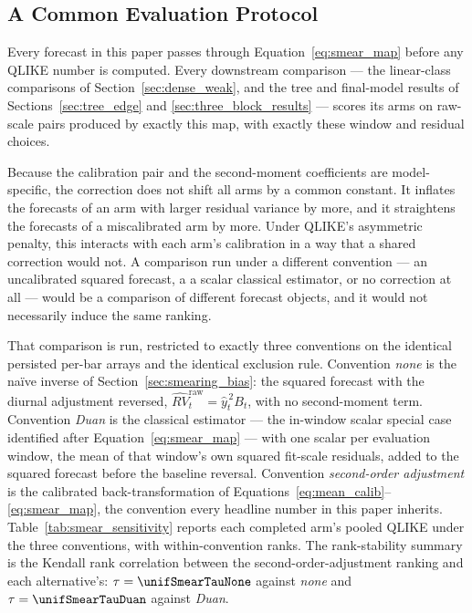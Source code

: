 \iffalse
\subsection{A Common Evaluation Protocol}
\label{sec:smearing_contract}

Every forecast in this paper passes through Equation~\eqref{eq:smear_map}
before any QLIKE number is computed. Every downstream comparison --- the
linear-class comparisons of Section~\ref{sec:dense_weak}, and the tree and final-model results of
Sections~\ref{sec:tree_edge} and \ref{sec:three_block_results} --- scores
its arms on raw-scale pairs produced by exactly this map,
with exactly these window and residual choices.

Because the calibration pair and the second-moment coefficients are
model-specific, the correction does not shift all arms by a common
constant. It inflates the forecasts of an arm with larger residual
variance by more, and it straightens the forecasts of a miscalibrated arm
by more. Under QLIKE's asymmetric penalty, this interacts with each arm's
calibration in a way that a shared correction would not. A comparison run
under a different convention --- an uncalibrated squared forecast, a
a scalar classical estimator, or no correction at all --- would be a comparison
of different forecast objects, and it would not necessarily induce the
same ranking.

That comparison is run, restricted to exactly three conventions on the
identical persisted per-bar arrays and the identical exclusion rule.
Convention \emph{none} is the na\"ive inverse of
Section~\ref{sec:smearing_bias}: the squared forecast with the diurnal
adjustment reversed, $\widehat{RV}_t^{\mathrm{raw}} = \hat{y}_t^{\,2} B_t$,
with no second-moment term. Convention \emph{Duan} is the classical \citet{Duan1983}
estimator --- the in-window scalar special case identified after
Equation~\eqref{eq:smear_map} --- with one scalar per evaluation window,
the mean of that window's own squared fit-scale residuals, added to the
squared forecast before the baseline reversal. Convention \emph{second-order adjustment}
is the calibrated back-transformation of
Equations~\eqref{eq:mean_calib}--\eqref{eq:smear_map}, the convention
every headline number in this paper inherits.
Table~\ref{tab:smear_sensitivity} reports each completed arm's pooled
QLIKE under the three conventions, with within-convention ranks. The
rank-stability summary is the Kendall rank correlation between the second-order-adjustment
ranking and each alternative's:
$\tau = \unifSmearTauNone$ against \emph{none} and
$\tau = \unifSmearTauDuan$ against \emph{Duan}.

